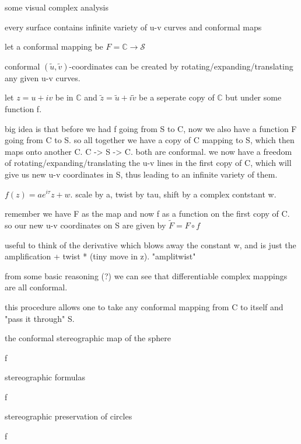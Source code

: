 \documentclass{article}
\newenvironment{andrew_section}[1]
    {
    \section{#1}
    \begin{itemize}
    }
    {
    \end{itemize}
    }
\begin{document}
\begin{andrew_section}{some visual complex analysis}
    \item 
        every surface contains infinite variety of u-v curves and conformal maps 
    \item 
        let a conformal mapping be $F = \mathbb{C} \rightarrow \mathcal{S}$
    \item 
        conformal $(\tilde{u}, \tilde{v})$-coordinates can be created by
        rotating/expanding/translating any given u-v curves.
    \item 
        let $z = u + iv$ be in $\mathbb{C}$ and 
        $\tilde{z} = \tilde{u} + i \tilde{v}$ be a seperate copy of $\mathbb{C}$
        but under some function f.
    \item 
        big idea is that before we had f going from S to C, now we also have a
        function F going from C to S.  so all together we have a copy of C
        mapping to S, which then maps onto another C.  C -> S -> C.
        both are conformal.  we now have a freedom of rotating/expanding/translating
        the u-v lines in the first copy of C, which will give us new u-v coordinates
        in S, thus leading to an infinite variety of them.
    \item 
        $f(z) = a e ^ {i \tau} z + w$. scale by a, twist by tau, shift by a complex
        contstant w.
    \item 
        remember we have F as the map and now f as a function on the first copy
        of C.  so our new u-v coordinates on S are given by $\tilde{F} = F \circ f$
    \item  
        useful to think of the derivative which blows away the constant w, and is just the 
        amplification + twist * (tiny move in z).  "amplitwist"
    \item 
        from some basic reasoning (?) we can see that differentiable complex mappings
        are all conformal.
    \item 
        this procedure allows one to take any conformal mapping from C to itself
        and "pass it through" S.
\end{andrew_section}

\begin{andrew_section}{the conformal stereographic map of the sphere}
    \item f
\end{andrew_section}

\begin{andrew_section}{stereographic formulas}
    \item f
\end{andrew_section}

\begin{andrew_section}{stereographic preservation of circles}
    \item f
\end{andrew_section}
\end{document}
